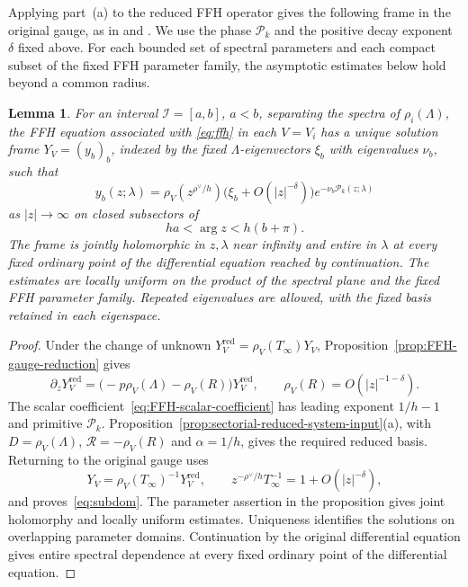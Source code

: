 \documentclass[11pt,leqno]{amsart}
\numberwithin{equation}{section}
\theoremstyle{plain}
\newtheorem{lemma}[theorem]{Lemma}
\theoremstyle{definition}
\theoremstyle{plain}
\theoremstyle{definition}
\theoremstyle{remark}
\begin{document}
Applying part~(a) to the reduced FFH operator gives the following frame in the original gauge, as in \cite[Proposition~3.20(1)]{MR2024} and \cite[Theorems~3.26(1) and~3.27(1)]{CGM2025}.  We use the phase $\mathcal P_k$ and the positive decay exponent $\delta$ fixed above.  For each bounded set of spectral parameters and each compact subset of the fixed FFH parameter family, the asymptotic estimates below hold beyond a common radius.

\begin{lemma}\label{lem:uniform-tensorial-FFH-reduction}
For an interval $\mathcal I=[a,b]$, $a<b$, separating the spectra of $\rho_i(\Lambda)$, the FFH equation associated with \eqref{eq:ffh} in each $V=V_i$ has a unique solution frame $Y_V=(y_b)_b$, indexed by the fixed $\Lambda$-eigenvectors $\xi_b$ with eigenvalues $\nu_b$, such that
\begin{equation}\label{eq:subdom}
 y_b(z;\lambda)
 =\rho_V\!\left(z^{\rho^\vee/h}\right)
   \bigl(\xi_b+O(|z|^{-\delta})\bigr)
   e^{-\nu_b\mathcal P_k(z;\lambda)}
\end{equation}
as $|z|\to\infty$ on closed subsectors of
\[
 ha<\arg z<h(b+\pi).
\]
The frame is jointly holomorphic in $z,\lambda$ near infinity and entire in $\lambda$ at every fixed ordinary point of the differential equation reached by continuation.  The estimates are locally uniform on the product of the spectral plane and the fixed FFH parameter family.  Repeated eigenvalues are allowed, with the fixed basis retained in each eigenspace.
\end{lemma}
\begin{proof}
Under the change of unknown $Y_V^{\mathrm{red}}=\rho_V(T_\infty)Y_V$, Proposition~\ref{prop:FFH-gauge-reduction} gives
\[
 \partial_zY_V^{\mathrm{red}}
 =\bigl(-p\rho_V(\Lambda)-\rho_V(R)\bigr)Y_V^{\mathrm{red}},
 \qquad \rho_V(R)=O(|z|^{-1-\delta}).
\]
The scalar coefficient~\eqref{eq:FFH-scalar-coefficient} has leading exponent $1/h-1$ and primitive $\mathcal P_k$.  Proposition~\ref{prop:sectorial-reduced-system-input}(a), with $D=\rho_V(\Lambda)$, $\mathcal R=-\rho_V(R)$ and $\alpha=1/h$, gives the required reduced basis.  Returning to the original gauge uses
\[
 Y_V=\rho_V(T_\infty)^{-1}Y_V^{\mathrm{red}},\qquad
 z^{-\rho^\vee/h}T_\infty^{-1}=1+O(|z|^{-\delta}),
\]
and proves~\eqref{eq:subdom}.  The parameter assertion in the proposition gives joint holomorphy and locally uniform estimates.  Uniqueness identifies the solutions on overlapping parameter domains.  Continuation by the original differential equation gives entire spectral dependence at every fixed ordinary point of the differential equation.
\end{proof}
\end{document}
